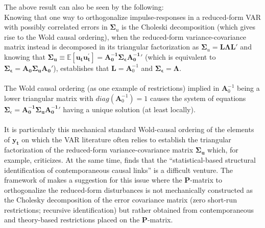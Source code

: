 \documentclass[a4paper,11pt,listof=nochaptergap,oneside,pointednumbers,bibtotoc,bigheadings,liststotoc,hidelinks]{scrbook}
\theoremstyle{mysatz}
\theoremstyle{mydefinition}
\theoremstyle{mytheorem}
\theoremstyle{mybemerkung}
\newcommand{\vect}[1]{\boldsymbol{\mathbf{#1}}}
\begin{document}
The above result can also be seen by the following:\\
Knowing that one way to orthogonalize impulse-responses in a reduced-form VAR with possibly correlated errors in $\vect{\Sigma}_u$ is the Choleski decomposition (which gives rise to the Wold causal ordering), when the reduced-form variance-covariance matrix instead is decomposed in its triangular factorization as $\vect{\Sigma}_u = \vect{L}\vect{\Lambda}\vect{L}'$ and knowing that $\vect{\Sigma_u}  \equiv \mathbb{E}[\vect{u_t}\vect{u_t^'}]= \vect{A_0^{-1}}\vect{\Sigma_\epsilon}\vect{A_0^{-1}}'$ (which is equivalent to $\vect{\Sigma_\epsilon} = \vect{A_0}\vect{\Sigma_u}\vect{A_0}'$), establishes that $\vect{L} = \vect{A}_0^{-1}$ and $\vect{\Sigma_\epsilon} = \vect{\Lambda}$. 
\\
\\
The Wold causal ordering (as one example of restrictions) implied in $\vect{A}_0^{-1}$ being a lower triangular matrix with $diag(\vect{A}_0^{-1}) = 1$ causes the system of equations $\vect{\Sigma}_\epsilon  = \vect{A_0^{-1}}\vect{\Sigma_u}\vect{A_0^{-1}}'$ having a unique solution (at least locally).
\\
\\
It is particularly this mechanical standard Wold-causal ordering of the elements of $\vect{y_t}$ on which the VAR literature often relies to establish the triangular factorization of the reduced-form variance-covariance matrix $\vect{\Sigma_u}$ which, for example, \citet{jorda:05} criticizes. At the same time, \citet[p. 4]{jorda:05} finds that the ``statistical-based structural identification of contemporaneous causal links'' is a difficult venture. The framework of \citet{ludvigsonetal:18,ludvigsonetal:19} makes a suggestion for this issue where the $\vect{P}$-matrix to orthogonalize the reduced-form disturbances is not mechanically constructed as the Cholesky decomposition of the error covariance matrix (zero short-run restrictions; recursive identification) but rather obtained from contemporaneous and theory-based restrictions placed on the $\vect{P}$-matrix.
\end{document}
